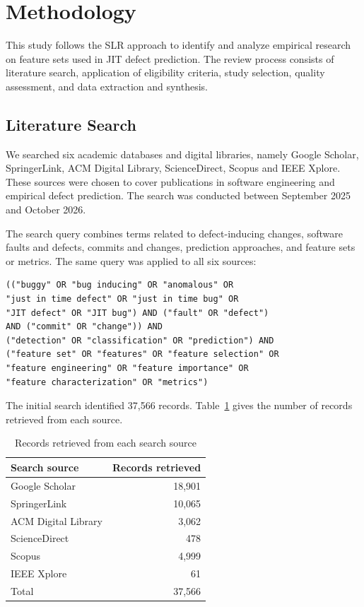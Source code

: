 \documentclass[sigconf,review]{acmart}
\begin{document}
\section{Methodology}
\label{S:methodology}

This study follows the SLR approach to identify and analyze empirical research on feature sets used in JIT defect prediction. The review process consists of literature search, application of eligibility criteria, study selection, quality assessment, and data extraction and synthesis.

\subsection{Literature Search}
\label{subsec:literature-search}

We searched six academic databases and digital libraries, namely Google Scholar, SpringerLink, ACM Digital Library, ScienceDirect, Scopus and IEEE Xplore. These sources were chosen to cover publications in software engineering and empirical defect prediction. The search was conducted between September 2025 and October 2026.

The search query combines terms related to defect-inducing changes, software faults and defects, commits and changes, prediction approaches, and feature sets or metrics. The same query was applied to all six sources:

{\footnotesize
\begin{verbatim}
(("buggy" OR "bug inducing" OR "anomalous" OR
"just in time defect" OR "just in time bug" OR
"JIT defect" OR "JIT bug") AND ("fault" OR "defect")
AND ("commit" OR "change")) AND
("detection" OR "classification" OR "prediction") AND
("feature set" OR "features" OR "feature selection" OR
"feature engineering" OR "feature importance" OR
"feature characterization" OR "metrics")
\end{verbatim}
}

The initial search identified 37,566 records. Table~\ref{tab:search-results} gives the number of records retrieved from each source.

\begin{table}[t]
    \centering
    \caption{Records retrieved from each search source}
    \label{tab:search-results}
    \begin{tabular}{lr}
        \toprule
        \textbf{Search source} & \textbf{Records retrieved} \\
        \midrule
        Google Scholar      & 18,901 \\
        SpringerLink        & 10,065 \\
        ACM Digital Library & 3,062 \\
        ScienceDirect       & 478 \\
        Scopus              & 4,999 \\
        IEEE Xplore         & 61 \\
        \midrule
        Total               & 37,566 \\
        \bottomrule
    \end{tabular}
\end{table}
\end{document}
